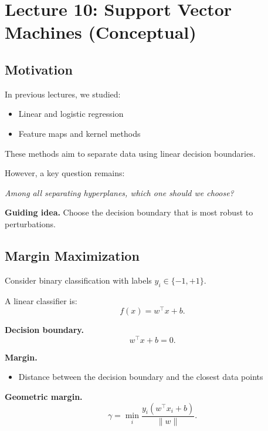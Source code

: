 \section{Lecture 10: Support Vector Machines (Conceptual)}

\subsection{Motivation}

In previous lectures, we studied:
\begin{itemize}
    \item Linear and logistic regression
    \item Feature maps and kernel methods
\end{itemize}

\medskip

\noindent
These methods aim to separate data using linear decision boundaries.

\medskip

\noindent
However, a key question remains:

\medskip

\noindent
\textit{Among all separating hyperplanes, which one should we choose?}

\medskip

\noindent
\textbf{Guiding idea.}  
Choose the decision boundary that is most robust to perturbations.

\subsection{Margin Maximization}

Consider binary classification with labels $y_i \in \{-1, +1\}$.

\medskip

\noindent
A linear classifier is:
\[
f(x) = w^\top x + b.
\]

\medskip

\noindent
\textbf{Decision boundary.}
\[
w^\top x + b = 0.
\]

\medskip

\noindent
\textbf{Margin.}
\begin{itemize}
    \item Distance between the decision boundary and the closest data points
\end{itemize}

\medskip

\noindent
\textbf{Geometric margin.}
\[
\gamma = \min_i \frac{y_i (w^\top x_i + b)}{\|w\|}.
\]

